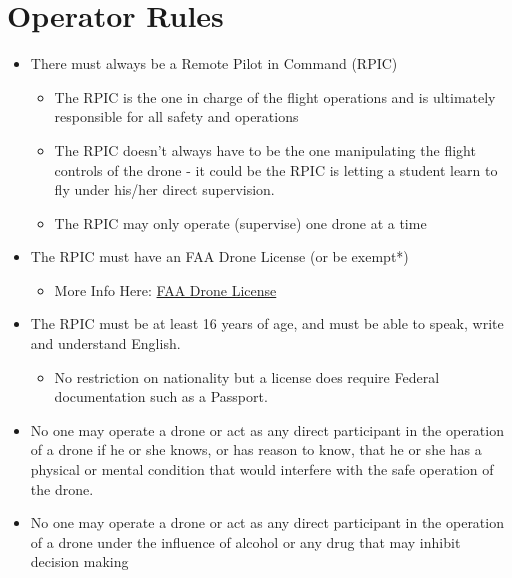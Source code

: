 \documentclass[
]{book}
\providecommand{\tightlist}{%
  \setlength{\itemsep}{0pt}\setlength{\parskip}{0pt}}
\begin{document}
\hypertarget{operator-rules}{%
\section{Operator Rules}\label{operator-rules}}

\begin{itemize}
\tightlist
\item
  There must always be a Remote Pilot in Command (RPIC)

  \begin{itemize}
  \tightlist
  \item
    The RPIC is the one in charge of the flight operations and is ultimately responsible for all safety and operations
  \item
    The RPIC doesn't always have to be the one manipulating the flight controls of the drone - it could be the RPIC is letting a student learn to fly under his/her direct supervision.
  \item
    The RPIC may only operate (supervise) one drone at a time
  \end{itemize}
\item
  The RPIC must have an FAA Drone License (or be exempt*)

  \begin{itemize}
  \tightlist
  \item
    More Info Here: \protect\hyperlink{ch-license}{FAA Drone License}
  \end{itemize}
\item
  The RPIC must be at least 16 years of age, and must be able to speak, write and understand English.

  \begin{itemize}
  \tightlist
  \item
    No restriction on nationality but a license does require Federal documentation such as a Passport.
  \end{itemize}
\item
  No one may operate a drone or act as any direct participant in the operation of a drone if he or she knows, or has reason to know, that he or she has a physical or mental condition that would interfere with the safe operation of the drone.
\item
  No one may operate a drone or act as any direct participant in the operation of a drone under the influence of alcohol or any drug that may inhibit decision making
\end{itemize}
\end{document}
